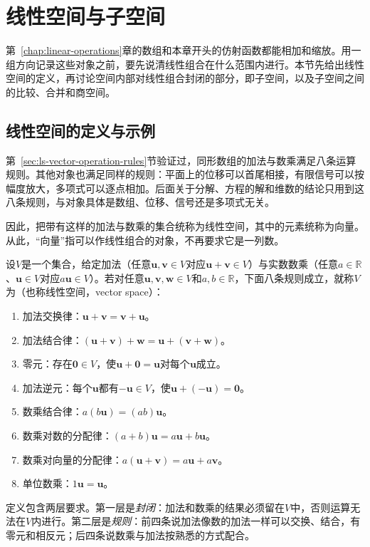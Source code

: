 
\section{线性空间与子空间}
\label{sec:ls-vector-spaces}
\label{sec:linear-algebra-vector-spaces-coordinates}

第~\ref{chap:linear-operations}章的数组和本章开头的仿射函数都能相加和缩放。用一组方向记录这些对象之前，要先说清线性组合在什么范围内进行。本节先给出线性空间的定义，再讨论空间内部对线性组合封闭的部分，即子空间，以及子空间之间的比较、合并和商空间。

\subsection{线性空间的定义与示例}
\label{sec:ls-space-axioms}

第~\ref{sec:ls-vector-operation-rules}节验证过，同形数组的加法与数乘满足八条运算规则。其他对象也满足同样的规则：平面上的位移可以首尾相接，有限信号可以按幅度放大，多项式可以逐点相加。后面关于分解、方程的解和维数的结论只用到这八条规则，与对象具体是数组、位移、信号还是多项式无关。

因此，把带有这样的加法与数乘的集合统称为线性空间，其中的元素统称为向量。从此，“向量”指可以作线性组合的对象，不再要求它是一列数。

\begin{definition}[实线性空间]
\label{def:ls-real-vector-space}
设$V$是一个集合，给定加法（任意$\bm u,\bm v\in V$对应$\bm u+\bm v\in V$）与实数数乘（任意$a\in\mathbb R$、$\bm u\in V$对应$a\bm u\in V$）。若对任意$\bm u,\bm v,\bm w\in V$和$a,b\in\mathbb R$，下面八条规则成立，就称$V$为（也称线性空间，vector space）：
\begin{enumerate}
 \item 加法交换律：$\bm u+\bm v=\bm v+\bm u$。
 \item 加法结合律：$(\bm u+\bm v)+\bm w=\bm u+(\bm v+\bm w)$。
 \item 零元：存在$\bm0\in V$，使$\bm u+\bm0=\bm u$对每个$\bm u$成立。
 \item 加法逆元：每个$\bm u$都有$-\bm u\in V$，使$\bm u+(-\bm u)=\bm0$。
 \item 数乘结合律：$a(b\bm u)=(ab)\bm u$。
 \item 数乘对数的分配律：$(a+b)\bm u=a\bm u+b\bm u$。
 \item 数乘对向量的分配律：$a(\bm u+\bm v)=a\bm u+a\bm v$。
 \item 单位数乘：$1\bm u=\bm u$。
\end{enumerate}
\end{definition}
定义包含两层要求。第一层是\emph{封闭}：加法和数乘的结果必须留在$V$中，否则运算无法在$V$内进行。第二层是\emph{规则}：前四条说加法像数的加法一样可以交换、结合，有零元和相反元；后四条说数乘与加法按熟悉的方式配合。

